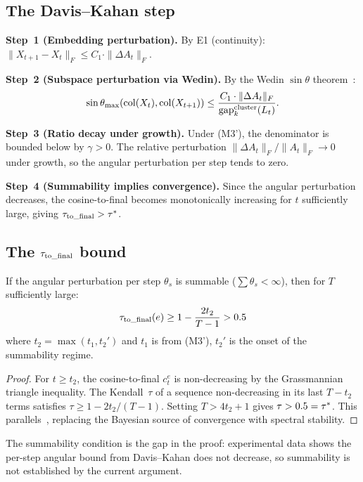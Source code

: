 \documentclass{../shared/primo}
\begin{document}
\subsection{The Davis--Kahan step}

\textbf{Step~1 (Embedding perturbation).} By E1 (continuity):
$\|X_{t+1} - X_t\|_F \leq C_1 \cdot \|\Delta A_t\|_F$.

\textbf{Step~2 (Subspace perturbation via Wedin).} By the Wedin $\sin\theta$ theorem~\cite{wedin1972perturbation}:
\[
\sin\theta_{\max}(\operatorname{col}(X_t), \operatorname{col}(X_{t+1})) \leq \frac{C_1 \cdot \|\Delta A_t\|_F}{\mathrm{gap}_k^{\mathrm{cluster}}(L_t)}.
\]

\textbf{Step~3 (Ratio decay under growth).} Under (M3'), the denominator is bounded below by $\gamma > 0$. The relative perturbation $\|\Delta A_t\|_F / \|A_t\|_F \to 0$ under growth, so the angular perturbation per step tends to zero.

\textbf{Step~4 (Summability implies convergence).} Since the angular perturbation decreases, the cosine-to-final becomes monotonically increasing for $t$ sufficiently large, giving $\tau_{\mathrm{to\_final}} > \tau^*$.

\subsection{The $\tau_{\mathrm{to\_final}}$ bound}

\begin{proposition}
If the angular perturbation per step $\theta_s$ is summable ($\sum \theta_s < \infty$), then for $T$ sufficiently large:
\[
\tau_{\mathrm{to\_final}}(e) \geq 1 - \frac{2t_2}{T - 1} > 0.5
\]
where $t_2 = \max(t_1, t_2')$ and $t_1$ is from \textup{(M3')}, $t_2'$ is the onset of the summability regime.
\end{proposition}

\begin{proof}
For $t \geq t_2$, the cosine-to-final $c_t^e$ is non-decreasing by the Grassmannian triangle inequality. The Kendall~$\tau$ of a sequence non-decreasing in its last $T - t_2$ terms satisfies $\tau \geq 1 - 2t_2/(T-1)$. Setting $T > 4t_2 + 1$ gives $\tau > 0.5 = \tau^*$. This parallels~\cite[Corollary~1]{kowalczyk2026bayesian}, replacing the Bayesian source of convergence with spectral stability.
\end{proof}

The summability condition is the gap in the proof: experimental data shows the per-step angular bound from Davis--Kahan does not decrease, so summability is not established by the current argument.
\end{document}
